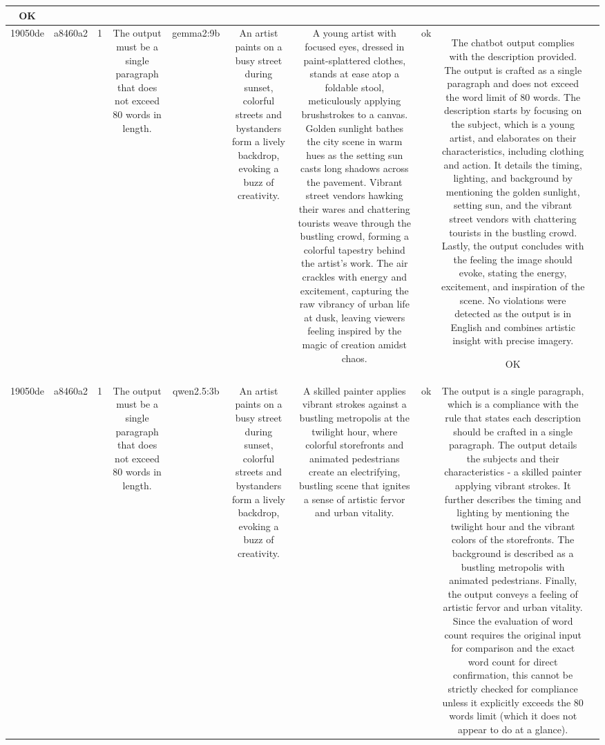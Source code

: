 \begin{table}[h!]
\begin{tabular}{|c|c|c|c|c|c|c|c|c|c|}
OK & \\
\hline
19050de & a8460a2 & 1 & The output must be a single paragraph that does not exceed 80 words in length. & gemma2:9b & An artist paints on a busy street during sunset, colorful streets and bystanders form a lively backdrop, evoking a buzz of creativity. & A young artist with focused eyes, dressed in paint-splattered clothes, stands at ease atop a foldable stool, meticulously applying brushstrokes to a canvas. Golden sunlight bathes the city scene in warm hues as the setting sun casts long shadows across the pavement. Vibrant street vendors hawking their wares and chattering tourists weave through the bustling crowd, forming a colorful tapestry behind the artist's work. The air crackles with energy and excitement, capturing the raw vibrancy of urban life at dusk,  leaving viewers feeling inspired by the magic of creation amidst chaos.  


 & ok & The chatbot output complies with the description provided. The output is crafted as a single paragraph and does not exceed the word limit of 80 words. The description starts by focusing on the subject, which is a young artist, and elaborates on their characteristics, including clothing and action. It details the timing, lighting, and background by mentioning the golden sunlight, setting sun, and the vibrant street vendors with chattering tourists in the bustling crowd. Lastly, the output concludes with the feeling the image should evoke, stating the energy, excitement, and inspiration of the scene. No violations were detected as the output is in English and combines artistic insight with precise imagery.

OK & \\
\hline
19050de & a8460a2 & 1 & The output must be a single paragraph that does not exceed 80 words in length. & qwen2.5:3b & An artist paints on a busy street during sunset, colorful streets and bystanders form a lively backdrop, evoking a buzz of creativity. & A skilled painter applies vibrant strokes against a bustling metropolis at the twilight hour, where colorful storefronts and animated pedestrians create an electrifying, bustling scene that ignites a sense of artistic fervor and urban vitality. & ok & The output is a single paragraph, which is a compliance with the rule that states each description should be crafted in a single paragraph. The output details the subjects and their characteristics - a skilled painter applying vibrant strokes. It further describes the timing and lighting by mentioning the twilight hour and the vibrant colors of the storefronts. The background is described as a bustling metropolis with animated pedestrians. Finally, the output conveys a feeling of artistic fervor and urban vitality. Since the evaluation of word count requires the original input for comparison and the exact word count for direct confirmation, this cannot be strictly checked for compliance unless it explicitly exceeds the 80 words limit (which it does not appear to do at a glance).


\end{tabular}
\end{table}
